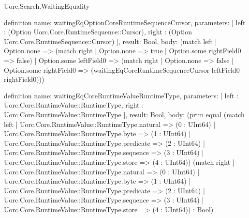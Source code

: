 \begin{lexlean}{Uorc.Search.WaitingEquality}
\begin{semanticmodule}
definition{
  name: waitingEqOptionCoreRuntimeSequenceCursor,
  parameters: [
    left : (Option Uorc.Core.RuntimeSequence::Cursor),
    right : (Option Uorc.Core.RuntimeSequence::Cursor)
  ],
  result: Bool,
  body: (match left
    | Option.none => (match right | Option.none => true | Option.some rightField0 => false)
    | Option.some leftField0 => (match right
      | Option.none => false
      | Option.some rightField0 => (waitingEqCoreRuntimeSequenceCursor leftField0 rightField0)))
}

definition{
  name: waitingEqCoreRuntimeValueRuntimeType,
  parameters: [
    left : Uorc.Core.RuntimeValue::RuntimeType,
    right : Uorc.Core.RuntimeValue::RuntimeType
  ],
  result: Bool,
  body: (prim equal (match left
    | Uorc.Core.RuntimeValue::RuntimeType.natural => (0 : UInt64)
    | Uorc.Core.RuntimeValue::RuntimeType.byte => (1 : UInt64)
    | Uorc.Core.RuntimeValue::RuntimeType.predicate => (2 : UInt64)
    | Uorc.Core.RuntimeValue::RuntimeType.sequence => (3 : UInt64)
    | Uorc.Core.RuntimeValue::RuntimeType.store => (4 : UInt64)) (match right
    | Uorc.Core.RuntimeValue::RuntimeType.natural => (0 : UInt64)
    | Uorc.Core.RuntimeValue::RuntimeType.byte => (1 : UInt64)
    | Uorc.Core.RuntimeValue::RuntimeType.predicate => (2 : UInt64)
    | Uorc.Core.RuntimeValue::RuntimeType.sequence => (3 : UInt64)
    | Uorc.Core.RuntimeValue::RuntimeType.store => (4 : UInt64)) : Bool)
}


\end{semanticmodule}
\end{lexlean}
